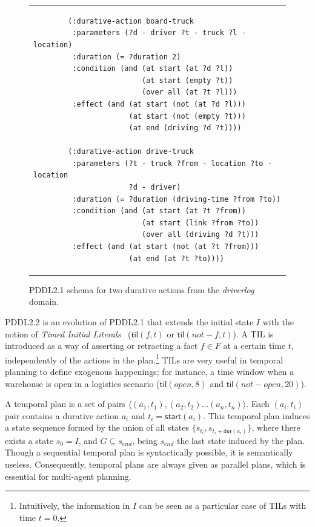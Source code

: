 \documentclass[10pt,journal,compsoc]{IEEEtran}
\newcommand{\tup}[1]{{\langle #1 \rangle}}
\newcommand{\dur}{\mathsf{dur}}    %
\newcommand{\start}{\mathsf{start}}%
\newcommand{\til}{\mathsf{til}}    %
\begin{document}
\begin{figure}
	{\scriptsize
	\begin{tabular}{p{\textwidth}}
		\begin{verbatim}
		(:durative-action board-truck
		 :parameters (?d - driver ?t - truck ?l - location)
		 :duration (= ?duration 2)
		 :condition (and (at start (at ?d ?l)) 
		                 (at start (empty ?t))
		                 (over all (at ?t ?l)))
		 :effect (and (at start (not (at ?d ?l))) 
		              (at start (not (empty ?t)))
		              (at end (driving ?d ?t))))
		
		(:durative-action drive-truck
		 :parameters (?t - truck ?from - location ?to - location 
		              ?d - driver)
		 :duration (= ?duration (driving-time ?from ?to))
		 :condition (and (at start (at ?t ?from)) 
		                 (at start (link ?from ?to))
		                 (over all (driving ?d ?t)))
		 :effect (and (at start (not (at ?t ?from))) 
		              (at end (at ?t ?to))))
		\end{verbatim}
	\end{tabular}
	}
	\caption{\small PDDL2.1 schema for two durative actions from the {\em driverlog} domain.}
	\label{fig:exampleactions2}
\end{figure}



PDDL2.2 is an evolution of PDDL2.1 that extends the initial state $I$ with the notion of {\em Timed Initial Literals}~\cite{hoffmann2005} ($\til(f,t)$ or $\til(not-f,t)$). A TIL is introduced as a way of asserting or retracting a fact $f \in F$ at a certain time $t$, independently of the actions in the plan.\footnote{Intuitively, the information in $I$ can be seen as a particular case of TILs with time $t=0$.} TILs are very useful in temporal planning to define exogenous happenings; for instance, a time window when a warehouse is open in a logistics scenario ($\til(open,8)$ and $\til(not-open,20)$).


A temporal plan is a set of pairs $\tup{(a_1,t_1),(a_2,t_2)\ldots (a_n,t_n)}$. Each $(a_i,t_i)$ pair contains a durative action $a_i$ and $t_i=\start(a_i)$.
This temporal plan induces a state sequence formed by the union of all states $\{s_{t_i}, s_{t_i+\dur(a_i)}\}$, where there exists a state $s_{0}=I$, and $G\subseteq s_{end}$, being $s_{end}$ the last state induced by the plan.
Though a sequential temporal plan is syntactically possible, it is semantically useless. Consequently, temporal plans are always given as parallel plans, which is essential for multi-agent planning.
\end{document}
